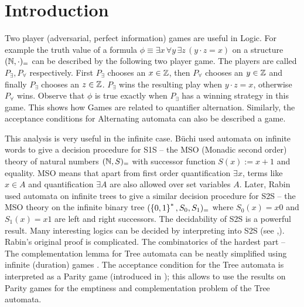 \chapter{Introduction}

Two player (adversarial, perfect information) games are useful in Logic. For example the truth value of a formula $\phi \equiv \exists x \, \forall y \, \exists z \, (y \cdot z = x)$ on a structure $(\mathbb{N},\cdot)_=$ can be described by the following two player game. The players are called $P_\exists,P_\forall$ respectively. First $P_\exists$ chooses an $x \in \mathbb{Z}$, then $P_\forall$ chooses an $y \in \mathbb{Z}$ and finally $P_\exists$ chooses an $z \in \mathbb{Z}$. $P_\exists$ wins the resulting play when $y \cdot z = x$, otherwise $P_\forall$ wins. Observe that $\phi$ is true exactly when $P_\exists$ has a winning strategy in this game. This shows how Games are related to quantifier alternation. Similarly, the acceptance conditions for Alternating automata can also be described a game.

This analysis is very useful in the infinite case. B\"uchi \cite{richard_buchi_symposium_1966} used automata on infinite words to give a decision procedure for S1S  -- the MSO (Monadic second order) theory of natural numbers $(\mathbb{N},S)_=$ with successor function $S(x) := x+1$ and equality. MSO means that apart from first order quantification $\exists x$, terms like $x \in A$ and quantification $\exists A$ are also allowed over set variables $A$. Later, Rabin \cite{rabin_decidability_1969} used automata on infinite trees to give a similar decision procedure for S2S -- the MSO theory on the infinite binary tree $(\left\{0,1\right\}^*,S_0,S_1)_=$ where $S_0(x)=x0$ and $S_1(x)=x1$ are left and right successors. The decidability of S2S is a powerful result. Many interesting logics can be decided by interpreting into S2S (see \cite{rabin_decidability_1969},\cite[Chap~7]{classical_prob}). Rabin's original proof is complicated. The combinatorics of the hardest part -- The complementation lemma for Tree automata can be neatly simplified using infinite (duration) games \cite[Chap~8]{thomas2002automata}. The acceptance condition for the Tree automata is interpreted as a Parity game (introduced in ); this allows to use the results on Parity games for the emptiness and complementation problem of the Tree automata.


